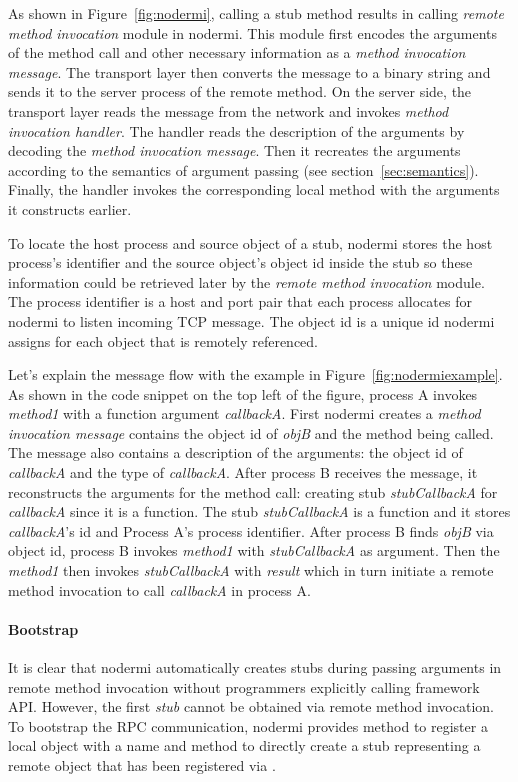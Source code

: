 \nodermifig{}

As shown in Figure~\ref{fig:nodermi},
calling a stub method results in calling
\emph{remote method invocation} module in nodermi.
This module
first encodes the arguments of the method call
 and other necessary information
as a \emph{method invocation message}.
The transport layer then converts the message to
a binary string and sends it
to the server process of the remote method.
On the server side, the transport layer reads
the message from the network and invokes \emph{method invocation handler}.
The handler reads the description of the arguments 
 by decoding the \emph{method invocation message}.
Then it recreates the arguments according to 
the semantics of argument passing (see section~\ref{sec:semantics}).
Finally, the handler invokes the corresponding local method with the arguments
it constructs earlier.

To locate the host process and source object of a stub,
nodermi stores the host process's identifier and the source object's object id
inside the stub so these information could be retrieved later by 
the \emph{remote method invocation} module.
The process identifier is a host and port pair that each process
allocates for nodermi to listen incoming TCP message.
The object id is a unique id nodermi assigns for each object that
is remotely referenced.


Let's explain the message flow with the example
in Figure~\ref{fig:nodermiexample}.
As shown in the code snippet on the top left of the figure,
process A invokes \emph{method1} with a function argument \emph{callbackA}.
First nodermi creates a \emph{method invocation message}
contains the object id of \emph{objB} and the method being called.
The message also contains a description of the arguments:
the object id of \emph{callbackA} and
the type of \emph{callbackA}.
After process B receives the message,
it reconstructs the arguments for the method call:
creating stub \emph{stubCallbackA} for \emph{callbackA} since it is a function.
The stub \emph{stubCallbackA} is a function and
it stores \emph{callbackA}'s id and Process A's process identifier.
After process B finds \emph{objB} via object id,
process B invokes \emph{method1} with \emph{stubCallbackA} as argument.
Then the \emph{method1} then invokes \emph{stubCallbackA} with \emph{result}
which in turn initiate a remote method invocation to call \emph{callbackA} in process A.


\paragraph{Bootstrap}
It is clear that nodermi automatically creates stubs during
passing arguments in remote method invocation without programmers
explicitly calling framework API.
However, the first \emph{stub} cannot be obtained
via remote method invocation.
To bootstrap the RPC communication,
nodermi provides  method
to register a local object with a name
and  method to 
directly create a stub representing
a remote object that has been registered via
.

